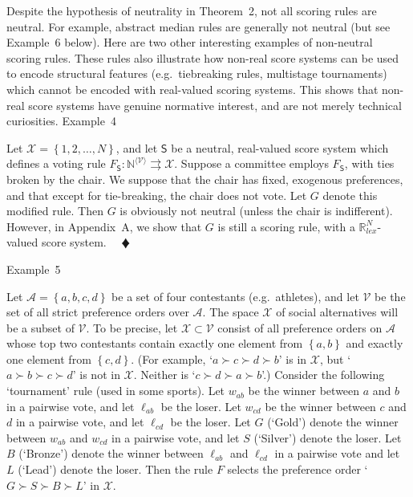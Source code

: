 \documentclass[
]{article}
\begin{document}
Despite the hypothesis of neutrality in Theorem~2, not all scoring rules
are neutral. For example, abstract median rules are generally not
neutral (but see Example~6 below). Here are two other interesting
examples of non-neutral scoring rules. These rules also illustrate how
non-real score systems can be used to encode structural features
(e.g.~tiebreaking rules, multistage tournaments) which cannot be encoded
with real-valued scoring systems. This shows that non-real score systems
have genuine normative interest, and are not merely technical
curiosities. Example~4

Let \(\mathcal{X} = \left\{ 1,2,\ldots,N \right\}\), and let
\(\mathsf{S}\) be a neutral, real-valued score system which defines a
voting rule
\(\left. F_{\mathsf{S}}:\mathbb{N}^{\langle\mathcal{V}\rangle}\rightrightarrows\mathcal{X} \right.\).
Suppose a committee employs \(F_{\mathsf{S}}\), with ties broken by the
chair. We suppose that the chair has fixed, exogenous preferences, and
that except for tie-breaking, the chair does not vote. Let \(G\) denote
this modified rule. Then \(G\) is obviously not neutral (unless the
chair is indifferent). However, in Appendix~A, we show that \(G\) is
still a scoring rule, with a \(\mathbb{R}_{lex}^{N}\)-valued score
system. \(\quad ♦\)

Example~5

Let \(\mathcal{A} = \left\{ a,b,c,d \right\}\) be a set of four
contestants (e.g.~athletes), and let \(\mathcal{V}\) be the set of all
strict preference orders over \(\mathcal{A}\). The space \(\mathcal{X}\)
of social alternatives will be a subset of \(\mathcal{V}\). To be
precise, let \(\mathcal{X} \subset \mathcal{V}\) consist of all
preference orders on \(\mathcal{A}\) whose top two contestants contain
exactly one element from \(\left\{ a,b \right\}\) and exactly one
element from \(\left\{ c,d \right\}\). (For example,
`\(a \succ c \succ d \succ b\)' is in \(\mathcal{X}\), but
`\(a \succ b \succ c \succ d\)' is not in \(\mathcal{X}\). Neither is
`\(c \succ d \succ a \succ b\)'.) Consider the following `tournament'
rule (used in some sports). Let \(w_{ab}\) be the winner between \(a\)
and \(b\) in a pairwise vote, and let \(\ell_{ab}\) be the loser. Let
\(w_{cd}\) be the winner between \(c\) and \(d\) in a pairwise vote, and
let \(\ell_{cd}\) be the loser. Let \(G\) (`Gold') denote the winner
between \(w_{ab}\) and \(w_{cd}\) in a pairwise vote, and let \(S\)
(`Silver') denote the loser. Let \(B\) (`Bronze') denote the winner
between \(\ell_{ab}\) and \(\ell_{cd}\) in a pairwise vote and let \(L\)
(`Lead') denote the loser. Then the rule \(F\) selects the preference
order `\(G \succ S \succ B \succ L\)' in \(\mathcal{X}\).
\end{document}
